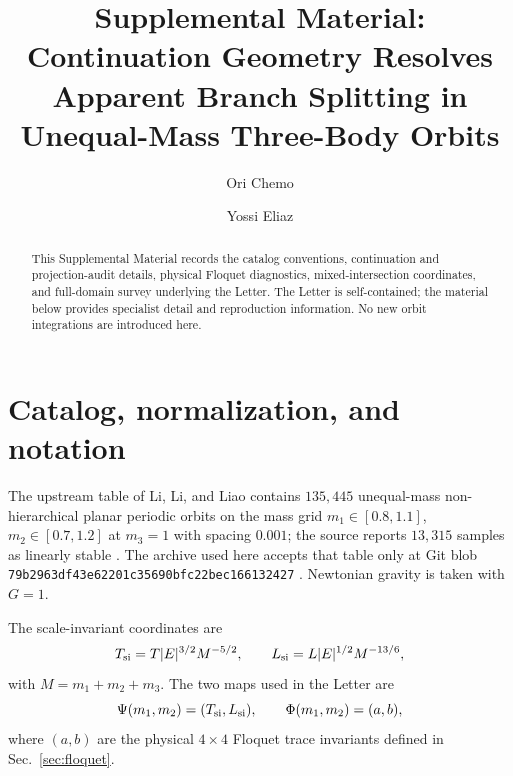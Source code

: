 \documentclass[aps,prl,onecolumn,amsmath,amssymb]{revtex4-2}
\begin{document}
\title{Supplemental Material:\\
Continuation Geometry Resolves Apparent Branch Splitting in Unequal-Mass Three-Body Orbits}

\author{Ori Chemo}

\author{Yossi Eliaz}

\begin{abstract}
This Supplemental Material records the catalog conventions, continuation and
projection-audit details, physical Floquet diagnostics, mixed-intersection
coordinates, and full-domain survey underlying the Letter. The Letter is
self-contained; the material below provides specialist detail and reproduction
information. No new orbit integrations are introduced here.
\end{abstract}

\maketitle

\section{Catalog, normalization, and notation}

The upstream table of Li, Li, and Liao contains $135{,}445$ unequal-mass
non-hierarchical planar periodic orbits on the mass grid
$m_1\in[0.8,1.1]$, $m_2\in[0.7,1.2]$ at $m_3=1$ with spacing $0.001$; the
source reports $13{,}315$ samples as linearly stable \cite{li2021stable}. The
archive used here accepts that table only at Git blob
\texttt{79b2963df43e62201c35690bfc22bec166132427}
\cite{eliaz2026archive}. Newtonian gravity is taken with $G=1$.

The scale-invariant coordinates are
\begin{equation}
T_{\rm si}=T\lvert E\rvert^{3/2}M^{-5/2},\qquad
L_{\rm si}=L\lvert E\rvert^{1/2}M^{-13/6},
\end{equation}
with $M=m_1+m_2+m_3$. The two maps used in the Letter are
\begin{equation}
\Psi(m_1,m_2)=(T_{\rm si},L_{\rm si}),\qquad
\Phi(m_1,m_2)=(a,b),
\end{equation}
where $(a,b)$ are the physical $4\times4$ Floquet trace invariants defined in
Sec.~\ref{sec:floquet}.
\end{document}
